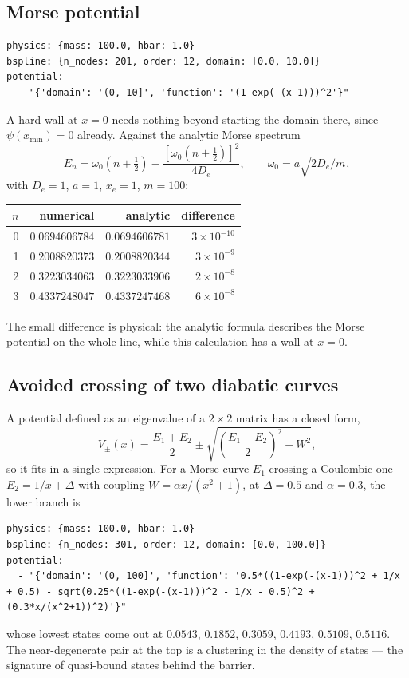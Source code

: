 \documentclass[11pt]{article}
\begin{document}
\subsection*{Morse potential}
\begin{lstlisting}[style=yaml]
physics: {mass: 100.0, hbar: 1.0}
bspline: {n_nodes: 201, order: 12, domain: [0.0, 10.0]}
potential:
  - "{'domain': '(0, 10]', 'function': '(1-exp(-(x-1)))^2'}"
\end{lstlisting}
A hard wall at $x=0$ needs nothing beyond starting the domain there, since
$\psi(x_{\min})=0$ already. Against the analytic Morse spectrum
\begin{equation*}
  E_n = \omega_0\left(n+\tfrac12\right)
      - \frac{\left[\omega_0\left(n+\tfrac12\right)\right]^{2}}{4D_e},
  \qquad \omega_0 = a\sqrt{2D_e/m},
\end{equation*}
with $D_e=1$, $a=1$, $x_e=1$, $m=100$:
\begin{center}
\begin{tabular}{@{}rrrr@{}}
\toprule
$n$ & numerical & analytic & difference \\
\midrule
0 & $0.0694606784$ & $0.0694606781$ & $3\times10^{-10}$ \\
1 & $0.2008820373$ & $0.2008820344$ & $3\times10^{-9}$ \\
2 & $0.3223034063$ & $0.3223033906$ & $2\times10^{-8}$ \\
3 & $0.4337248047$ & $0.4337247468$ & $6\times10^{-8}$ \\
\bottomrule
\end{tabular}
\end{center}
The small difference is physical: the analytic formula describes the Morse
potential on the whole line, while this calculation has a wall at $x=0$.

\subsection*{Avoided crossing of two diabatic curves}

A potential defined as an eigenvalue of a $2\times2$ matrix has a closed form,
\begin{equation}
  V_{\pm}(x) = \frac{E_{1}+E_{2}}{2}
  \pm \sqrt{\left(\frac{E_{1}-E_{2}}{2}\right)^{2} + W^{2}},
\end{equation}
so it fits in a single expression. For a Morse curve $E_1$ crossing a
Coulombic one $E_2 = 1/x + \Delta$ with coupling $W = \alpha x/(x^{2}+1)$, at
$\Delta=0.5$ and $\alpha=0.3$, the lower branch is
\begin{lstlisting}[style=yaml]
physics: {mass: 100.0, hbar: 1.0}
bspline: {n_nodes: 301, order: 12, domain: [0.0, 100.0]}
potential:
  - "{'domain': '(0, 100]', 'function': '0.5*((1-exp(-(x-1)))^2 + 1/x + 0.5) - sqrt(0.25*((1-exp(-(x-1)))^2 - 1/x - 0.5)^2 + (0.3*x/(x^2+1))^2)'}"
\end{lstlisting}
whose lowest states come out at $0.0543$, $0.1852$, $0.3059$, $0.4193$,
$0.5109$, $0.5116$. The near-degenerate pair at the top is a clustering in the
density of states --- the signature of quasi-bound states behind the barrier.
\end{document}
